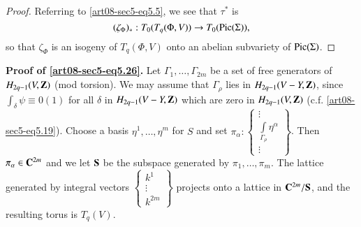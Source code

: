 \begin{proof}
Referring to \eqref{art08-sec5-eq5.5}, we see that $\tau^{*}$ is
$$
(\zeta_{\Phi})_{*}:T_{0}(T_{q}(\Phi,V))\to T_{0}(\operatorname{\mathrm{Pic}}(\Sigma)),
$$
so that $\zeta_{\Phi}$ is an isogeny of $T_{q}(\Phi,V)$ onto an abelian subvariety of $\operatorname{\mathrm{Pic}}(\Sigma)$.
\end{proof}

\noindent
{\bf Proof of \eqref{art08-sec5-eq5.26}.} Let $\Gamma_{1},\ldots,\Gamma_{2m}$ be a set of free generators of $H_{2q-1}\break (V,\bfZ)$ (mod torsion). We may assume that $\Gamma_{\rho}$ lies in $H_{2q-1}(V-Y,\mathbf{Z})$, since $\int_{\delta}\psi\equiv 0(1)$ for all $\delta$ in $H_{2q-1}(V-Y,\mathbf{Z})$ which are zero in $H_{2q-1}\break (V,\bfZ)$ (c.f. \eqref{art08-sec5-eq5.19}). Choose a basis $\eta^{1},\ldots,\eta^{m}$ for $S$ and set $\pi_{\alpha}:\left\{\begin{smallmatrix} \vdots\\ \int\limits_{\Gamma_{\rho}}\eta^{\alpha}\\ \vdots\end{smallmatrix}\right\}$. Then $\pi_{\alpha}\in \mathbf{C}^{2m}$ and we let $\mathbf{S}$ be the subspace generated by $\pi_{1},\ldots,\pi_{m}$. The lattice generated by integral vectors $\left\{\begin{smallmatrix} k^{1} \\ \vdots\\ k^{2m}\end{smallmatrix}\right\}$ projects onto a lattice in $\mathbf{C}^{2m}/\mathbf{S}$, and the resulting torus is $T_{q}(V)$.

